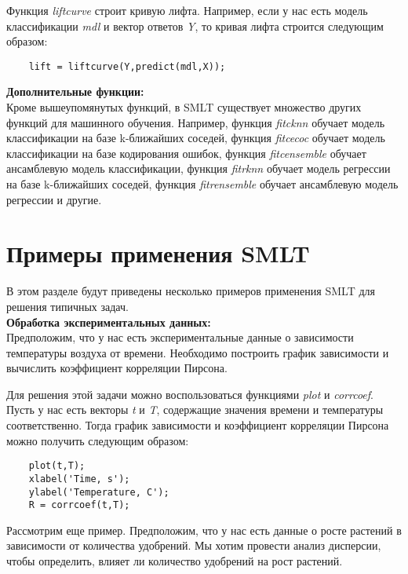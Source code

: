 \documentclass[a4paper, 12pt]{article}%
\begin{document}
\begin{titlepage}
	
	Функция \textit{liftcurve} строит кривую лифта. Например, если у нас есть модель классификации \textit{mdl} и вектор ответов \textit{Y}, то кривая лифта строится следующим образом:\\
	
	
	\begin{lstlisting}
	lift = liftcurve(Y,predict(mdl,X));
	\end{lstlisting}
	
	
	\textbf{Дополнительные функции:}\\	
	Кроме вышеупомянутых функций, в SMLT существует множество других функций для машинного обучения. Например, функция \textit{fitcknn} обучает модель классификации на базе k-ближайших соседей, функция \textit{fitcecoc} обучает модель классификации на базе кодирования ошибок, функция \textit{fitcensemble} обучает ансамблевую модель классификации, функция \textit{fitrknn} обучает модель регрессии на базе k-ближайших соседей, функция \textit{fitrensemble} обучает ансамблевую модель регрессии и другие.
	
	\section{Примеры применения SMLT}
	
	В этом разделе будут приведены несколько примеров применения SMLT для решения типичных задач.\\
	
	\textbf{Обработка экспериментальных данных:}\\
	Предположим, что у нас есть экспериментальные данные о зависимости температуры воздуха от времени. Необходимо построить график зависимости и вычислить коэффициент корреляции Пирсона.
	
	Для решения этой задачи можно воспользоваться функциями \textit{plot} и \textit{corrcoef}. Пусть у нас есть векторы \textit{t} и \textit{T}, содержащие значения времени и температуры соответственно. Тогда график зависимости и коэффициент корреляции Пирсона можно получить следующим образом:\\
	
	
	\begin{lstlisting}
	plot(t,T);
	xlabel('Time, s');
	ylabel('Temperature, C');
	R = corrcoef(t,T);
	\end{lstlisting}
	
	
	Рассмотрим еще пример. Предположим, что у нас есть данные о росте растений в зависимости от количества удобрений. Мы хотим провести анализ дисперсии, чтобы определить, влияет ли количество удобрений на рост растений.
	

\end{titlepage}
\end{document}
